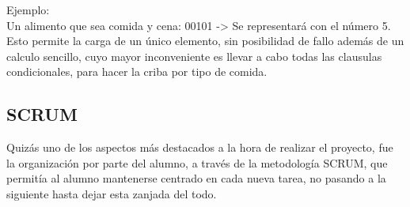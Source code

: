 Ejemplo:\\
Un alimento que sea comida y cena: 00101 -> Se representará con el número 5. \\
Esto permite la carga de un único elemento, sin posibilidad de fallo además de un calculo sencillo, cuyo mayor inconveniente es llevar a cabo todas las clausulas condicionales, para hacer la criba por tipo de comida.\\
\subsection{SCRUM}
Quizás uno de los aspectos más destacados a la hora de realizar el proyecto, fue la organización por parte del alumno, a través de la metodología SCRUM, que permitía al alumno mantenerse centrado en cada nueva tarea, no pasando a la siguiente hasta dejar esta zanjada del todo. \\

